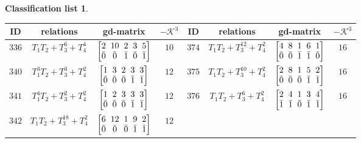 \documentclass[pdftex]{sigma}%
\theoremstyle{definition}
\newtheorem{class-list}[thm]{Classification list}
\numberwithin{equation}{section}
\begin{document}
\begin{class-list}
\begin{table}[h!]\centering\setlength{\tabcolsep}{3.5pt}
\renewcommand{\arraystretch}{1.3}\small\tabulinesep=1mm
\begin{tabu}{c|c|c|c||c|c|c|c}
\hline
ID&relations&gd-matrix&$-\mathcal{K}^3$&ID&relations&gd-matrix&$-\mathcal{K}^3$
\\
\hline
${336}$&${T_{1}T_{2}+T_{3}^{6}+T_{4}^{4}}$
&$\arraycolsep=1mm\begin{bmatrix}{2} & {10} & {2} & {3} & {5} \\ {\bar{0}} & {\bar{0}} & {\bar{1}} & {\bar{0}} & {\bar{1}}\end{bmatrix}$&${10}$
&${374}$&${T_{1}T_{2}+T_{3}^{12}+T_{4}^{2}}$
&$\arraycolsep=1mm\begin{bmatrix}{4} & {8} & {1} & {6} & {1} \\ {\bar{0}} & {\bar{0}} & {\bar{1}} & {\bar{1}} & {\bar{0}}\end{bmatrix}$&${16}$
\\
\hline
${340}$&${T_{1}^{3}T_{2}+T_{3}^{3}+T_{4}^{2}}$
&$\arraycolsep=1mm\begin{bmatrix}{1} & {3} & {2} & {3} & {3} \\ {\bar{0}} & {\bar{0}} & {\bar{0}} & {\bar{1}} & {\bar{1}}\end{bmatrix}$&${12}$
&${375}$&${T_{1}T_{2}+T_{3}^{10}+T_{4}^{2}}$
&$\arraycolsep=1mm\begin{bmatrix}{2} & {8} & {1} & {5} & {2} \\ {\bar{0}} & {\bar{0}} & {\bar{0}} & {\bar{1}} & {\bar{1}}\end{bmatrix}$&${16}$
\\
\hline
${341}$&${T_{1}^{4}T_{2}+T_{3}^{2}+T_{4}^{2}}$
&$\arraycolsep=1mm\begin{bmatrix}{1} & {2} & {3} & {3} & {3} \\ {\bar{0}} & {\bar{0}} & {\bar{0}} & {\bar{1}} & {\bar{1}}\end{bmatrix}$&${12}$
&${376}$&${T_{1}T_{2}+T_{3}^{6}+T_{4}^{2}}$
&$\arraycolsep=1mm\begin{bmatrix}{2} & {4} & {1} & {3} & {4} \\ {\bar{1}} & {\bar{1}} & {\bar{0}} & {\bar{1}} & {\bar{1}}\end{bmatrix}$&${16}$
\\
\hline
${342}$&${T_{1}T_{2}+T_{3}^{18}+T_{4}^{2}}$
&$\arraycolsep=1mm\begin{bmatrix}{6} & {12} & {1} & {9} & {2} \\ {\bar{0}} & {\bar{0}} & {\bar{0}} & {\bar{1}} & {\bar{1}}\end{bmatrix}$&${12}$

\end{tabu}
\end{table}
\end{class-list}
\end{document}
